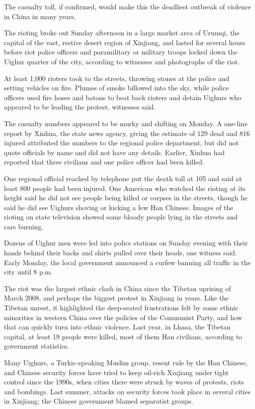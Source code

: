 ﻿\documentclass[12pt]{article}
\begin{document}
The casualty toll, if confirmed, would make this the deadliest outbreak of violence in China in many
years.

The rioting broke out Sunday afternoon in a large market area of Urumqi, the capital of the vast,
restive desert region of Xinjiang, and lasted for several hours before riot police officers and
paramilitary or military troops locked down the Uighur quarter of the city, according to witnesses
and photographs of the riot.

At least 1,000 rioters took to the streets, throwing stones at the police and setting vehicles on
fire. Plumes of smoke billowed into the sky, while police officers used fire hoses and batons to
beat back rioters and detain Uighurs who appeared to be leading the protest, witnesses said.

The casualty numbers appeared to be murky and shifting on Monday. A one-line report by Xinhua, the
state news agency, giving the estimate of 129 dead and 816 injured attributed the numbers to the
regional police department, but did not quote officials by name and did not have any details.
Earlier, Xinhua had reported that three civilians and one police officer had been killed.

One regional official reached by telephone put the death toll at 105 and said at least 800 people
had been injured. One American who watched the rioting at its height said he did not see people
being killed or corpses in the streets, though he said he did see Uighurs shoving or kicking a few
Han Chinese. Images of the rioting on state television showed some bloody people lying in the
streets and cars burning.

Dozens of Uighur men were led into police stations on Sunday evening with their hands behind their
backs and shirts pulled over their heads, one witness said. Early Monday, the local government
announced a curfew banning all traffic in the city until 8 p.m.

The riot was the largest ethnic clash in China since the Tibetan uprising of March 2008, and perhaps
the biggest protest in Xinjiang in years. Like the Tibetan unrest, it highlighted the deep-seated
frustrations felt by some ethnic minorities in western China over the policies of the Communist
Party, and how that can quickly turn into ethnic violence. Last year, in Lhasa, the Tibetan capital,
at least 19 people were killed, most of them Han civilians, according to government statistics.

Many Uighurs, a Turkic-speaking Muslim group, resent rule by the Han Chinese, and Chinese security
forces have tried to keep oil-rich Xinjiang under tight control since the 1990s, when cities there
were struck by waves of protests, riots and bombings. Last summer, attacks on security forces took
place in several cities in Xinjiang; the Chinese government blamed separatist groups.
\end{document}
